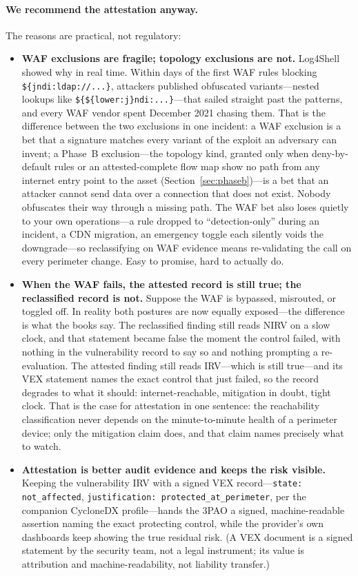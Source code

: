 \documentclass[11pt]{article}
\newcommand{\code}[1]{\texttt{#1}}
\begin{document}
\paragraph{We recommend the attestation anyway.} The reasons are practical, not regulatory:
\begin{itemize}[leftmargin=1.5em]
\item \textbf{WAF exclusions are fragile; topology exclusions are not.} Log4Shell showed why in real time. Within days of the first WAF rules blocking \code{\$\{jndi:ldap://...\}}, attackers published obfuscated variants---nested lookups like \code{\$\{\$\{lower:j\}ndi:...\}}---that sailed straight past the patterns, and every WAF vendor spent December 2021 chasing them. That is the difference between the two exclusions in one incident: a WAF exclusion is a bet that a signature matches every variant of the exploit an adversary can invent; a Phase~B exclusion---the topology kind, granted only when deny-by-default rules or an attested-complete flow map show no path from any internet entry point to the asset (Section~\ref{sec:phaseb})---is a bet that an attacker cannot send data over a connection that does not exist. Nobody obfuscates their way through a missing path. The WAF bet also loses quietly to your own operations---a rule dropped to ``detection-only'' during an incident, a CDN migration, an emergency toggle each silently voids the downgrade---so reclassifying on WAF evidence means re-validating the call on every perimeter change. Easy to promise, hard to actually do.
\item \textbf{When the WAF fails, the attested record is still true; the reclassified record is not.} Suppose the WAF is bypassed, misrouted, or toggled off. In reality both postures are now equally exposed---the difference is what the books say. The reclassified finding still reads NIRV on a slow clock, and that statement became false the moment the control failed, with nothing in the vulnerability record to say so and nothing prompting a re-evaluation. The attested finding still reads IRV---which is still true---and its VEX statement names the exact control that just failed, so the record degrades to what it should: internet-reachable, mitigation in doubt, tight clock. That is the case for attestation in one sentence: the reachability classification never depends on the minute-to-minute health of a perimeter device; only the mitigation claim does, and that claim names precisely what to watch.
\item \textbf{Attestation is better audit evidence and keeps the risk visible.} Keeping the vulnerability IRV with a signed VEX record---\code{state: not\_affected}, \code{justification: protected\_at\_perimeter}, per the companion CycloneDX profile---hands the 3PAO a signed, machine-readable assertion naming the exact protecting control, while the provider's own dashboards keep showing the true residual risk. (A VEX document is a signed statement by the security team, not a legal instrument; its value is attribution and machine-readability, not liability transfer.)

\end{itemize}
\end{document}
